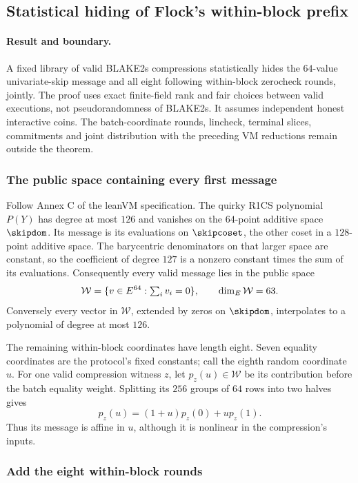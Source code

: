 \subsection{Statistical hiding of Flock's within-block prefix}\label{note:zk-flock-skip}

\paragraph{Result and boundary.} A fixed library of valid BLAKE2s compressions statistically hides the $64$-value univariate-skip message and all eight following within-block zerocheck rounds, jointly. The proof uses exact finite-field rank and fair choices between valid executions, not pseudorandomness of BLAKE2s. It assumes independent honest interactive coins. The batch-coordinate rounds, lincheck, terminal slices, commitments and joint distribution with the preceding VM reductions remain outside the theorem.

\subsubsection{The public space containing every first message}

Follow Annex C of the leanVM specification. The quirky R1CS polynomial $P(Y)$ has degree at most $126$ and vanishes on the $64$-point additive space $\skipdom$. Its message is its evaluations on $\skipcoset$, the other coset in a $128$-point additive space. The barycentric denominators on that larger space are constant, so the coefficient of degree $127$ is a nonzero constant times the sum of its evaluations. Consequently every valid message lies in the public space
\[
 \mathcal W=\{v\in E^{64}:\textstyle\sum_i v_i=0\},
 \qquad \dim_{E}\mathcal W=63.
\]
Conversely every vector in $\mathcal W$, extended by zeros on $\skipdom$, interpolates to a polynomial of degree at most $126$.

The remaining within-block coordinates have length eight. Seven equality coordinates are the protocol's fixed constants; call the eighth random coordinate $u$. For one valid compression witness $z$, let $p_z(u)\in\mathcal W$ be its contribution before the batch equality weight. Splitting its $256$ groups of $64$ rows into two halves gives
\[
 p_z(u)=(1+u)p_z(0)+u p_z(1).
\]
Thus its message is affine in $u$, although it is nonlinear in the compression's inputs.

\subsubsection{Add the eight within-block rounds}

